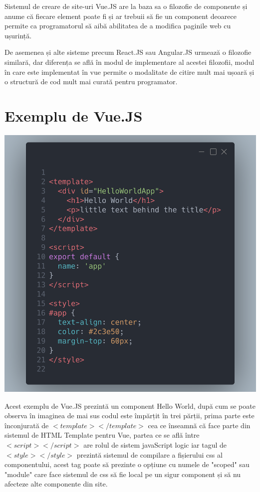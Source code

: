 \documentclass{article}
\begin{document}
Sistemul de creare de site-uri Vue.JS are la baza sa o filozofie de componente și anume că fiecare element poate fi și ar trebuii să fie un component deoarece permite ca programatorul să aibă abilitatea de a modifica paginile web cu ușurință.

De asemenea și alte sisteme precum React.JS sau Angular.JS urmează o filozofie similară, dar diferența se află în modul de implementare al acestei filozofii, modul în care este implementat în vue permite o modalitate de citire mult mai ușoară și o structură de cod mult mai curată pentru programator.


\section{Exemplu de Vue.JS}
\includegraphics[width=\textwidth]{exampleVue1.png}

Acest exemplu de Vue.JS prezintă un component Hello World, după cum
se poate observa în imaginea de mai sus codul este împărțit în trei
părții, prima parte este înconjurată de $<template> </template>$ cea
ce înseamnă că face parte din sistemul de HTML Template pentru Vue,
partea ce se află între $<script> </script>$ are rolul de sistem
javaScript logic iar tagul de $<style> </style>$ prezintă sistemul de
compilare a fișierului css al componentului, acest tag poate să
prezinte o opțiune cu numele de "scoped" sau "module" care face
sistemul de css să fie local pe un sigur component și să nu afecteze
alte componente din site.
\end{document}
